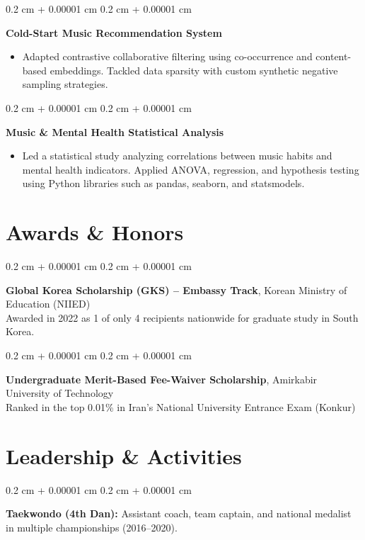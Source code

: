 \documentclass[10pt, letterpaper]{article}
\newenvironment{highlights}{
    \begin{itemize}[
        topsep=0.10 cm,
        parsep=0.10 cm,
        partopsep=0pt,
        itemsep=0pt,
        leftmargin=0.4 cm + 10pt
    ]
}{
    \end{itemize}
} %
\newenvironment{onecolentry}{
    \begin{adjustwidth}{
        0.2 cm + 0.00001 cm
    }{
        0.2 cm + 0.00001 cm
    }
}{
    \end{adjustwidth}
} %
\let\hrefWithoutArrow\href
\renewcommand{\href}[2]{\hrefWithoutArrow{#1}{\ifthenelse{\equal{#2}{}}{ }{#2 }\raisebox{.15ex}{\footnotesize \faExternalLink*}}}
\begin{document}
\vspace{0.1cm}

\begin{onecolentry}
    \textbf{Cold-Start Music Recommendation System} \hfill \href{https://github.com/mahsaAgz/MusicRecSys}{GitHub}
    \begin{highlights}
        \item Adapted contrastive collaborative filtering using co-occurrence and content-based embeddings. Tackled data sparsity with custom synthetic negative sampling strategies.
    \end{highlights}
\end{onecolentry}

\vspace{0.1cm}

\begin{onecolentry}
    \textbf{Music \& Mental Health Statistical Analysis} \hfill \href{https://github.com/mahsaAgz/Music-MentalHealth}{GitHub}
    \begin{highlights}
        \item Led a statistical study analyzing correlations between music habits and mental health indicators. Applied ANOVA, regression, and hypothesis testing using Python libraries such as pandas, seaborn, and statsmodels.
    \end{highlights}
\end{onecolentry}


\section{Awards \& Honors}

\begin{onecolentry}
    \textbf{Global Korea Scholarship (GKS) – Embassy Track}, Korean Ministry of Education (NIIED) \\
    Awarded in 2022 as 1 of only 4 recipients nationwide for graduate study in South Korea.
\end{onecolentry}

\vspace{0.1cm}

\begin{onecolentry}
    \textbf{Undergraduate Merit-Based Fee-Waiver Scholarship}, Amirkabir University of Technology \\
    Ranked in the top 0.01\% in Iran's National University Entrance Exam (Konkur) 
\end{onecolentry}


\section{Leadership \& Activities}

\begin{onecolentry}
    \textbf{Taekwondo (4th Dan):} Assistant coach, team captain, and national medalist in multiple championships (2016–2020).
\end{onecolentry}
\end{document}
